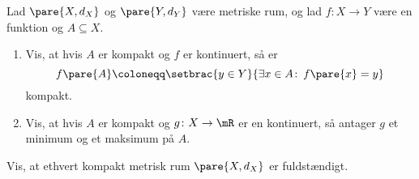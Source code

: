 \begin{opg}
Lad $\pare{X,d_X}$ og $\pare{Y,d_Y}$ være metriske rum, og lad $f\colon X\to Y$ være en funktion og $A\subseteq X$.
\begin{enumerate}
    \item Vis, at hvis $A$ er kompakt og $f$ er kontinuert, så er 
    $$ f\pare{A} \coloneqq \setbrac{y\in Y}{\exists x\in A\colon\, f\pare{x} = y} $$
    kompakt.
    
    \item Vis, at hvis $A$ er kompakt og $g\colon X\to \mR$ er en kontinuert, så antager $g$ et minimum og et maksimum på $A$.
\end{enumerate}
\end{opg}

\begin{opg}
Vis, at ethvert kompakt metrisk rum $\pare{X,d_X}$ er fuldstændigt.
\end{opg}